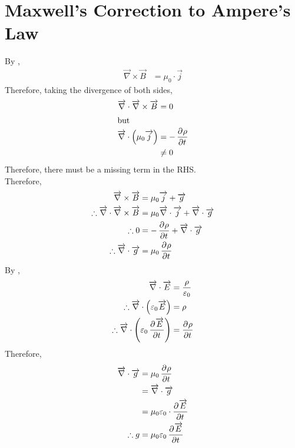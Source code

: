 \documentclass[fleqn, a4paper, 12pt, twoside]{article}
\theoremstyle{definition}
\theoremstyle{theorem}
\begin{document}
\section{Maxwell's Correction to Ampere's Law}
By ,
\begin{align*}
	\overrightarrow{\nabla} \times \overrightarrow{B} & = \mu_0 \cdot \overrightarrow{j}
\end{align*}
Therefore, taking the divergence of both sides,
\begin{align*}
	\overrightarrow{\nabla} \cdot \overrightarrow{\nabla} \times \overrightarrow{B} & = 0              \\
	\intertext{but}
	\overrightarrow{\nabla} \cdot \left( \mu_0 \overrightarrow{j} \right)           & = -\dpd{\rho}{t} \\
                                                                                        & \neq 0
\end{align*}
Therefore, there must be a missing term in the RHS.\\
Therefore,
\begin{align*}
	\overrightarrow{\nabla} \times \overrightarrow{B}                                          & = \mu_0 \overrightarrow{j} + \overrightarrow{g}                                                             \\
	\therefore \overrightarrow{\nabla} \cdot \overrightarrow{\nabla} \times \overrightarrow{B} & = \mu_0 \overrightarrow{\nabla} \cdot \overrightarrow{j} + \overrightarrow{\nabla} \cdot \overrightarrow{g} \\
	\therefore 0                                                                               & = -\dpd{\rho}{t} + \overrightarrow{\nabla} \cdot \overrightarrow{g}                                         \\
	\therefore \overrightarrow{\nabla} \cdot \overrightarrow{g}                                & = \mu_0 \dpd{\rho}{t}
\end{align*}
By ,
\begin{align*}
	\overrightarrow{\nabla} \cdot \overrightarrow{E}                                                  & = \frac{\rho}{\varepsilon_0} \\
	\therefore \overrightarrow{\nabla} \cdot \left( \varepsilon_0 \overrightarrow{E} \right)          & = \rho                       \\
	\therefore \overrightarrow{\nabla} \cdot \left( \varepsilon_0 \dpd{\overrightarrow{E}}{t} \right) & = \dpd{\rho}{t}
\end{align*}
Therefore,
\begin{align*}
	\overrightarrow{\nabla} \cdot \overrightarrow{g} & = \mu_0 \dpd{\rho}{t}                                   \\
                                                         & = \overrightarrow{\nabla} \cdot \overrightarrow{g}      \\
                                                         & = \mu_0 \varepsilon_0 \cdot \dpd{\overrightarrow{E}}{t} \\
	\therefore g                                     & = \mu_0 \varepsilon_0 \dpd{\overrightarrow{E}}{t}
\end{align*}
\end{document}

